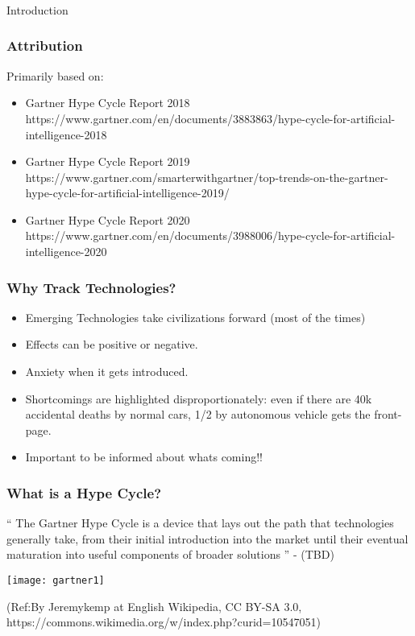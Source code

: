 \begin{frame}[fragile]\frametitle{}
\begin{center}
{\Large Introduction}
\end{center}
\end{frame}

\begin{frame}[fragile]\frametitle{Attribution}

Primarily based on:
\begin{itemize}
\item Gartner Hype Cycle Report 2018 {\tiny https://www.gartner.com/en/documents/3883863/hype-cycle-for-artificial-intelligence-2018}
\item Gartner Hype Cycle Report 2019 {\tiny https://www.gartner.com/smarterwithgartner/top-trends-on-the-gartner-hype-cycle-for-artificial-intelligence-2019/}
\item Gartner Hype Cycle Report 2020 {\tiny https://www.gartner.com/en/documents/3988006/hype-cycle-for-artificial-intelligence-2020}
\end{itemize}
\end{frame}


\begin{frame}[fragile]\frametitle{Why Track Technologies?}

\begin{itemize}
\item Emerging Technologies take civilizations forward (most of the times)
\item Effects can be positive or negative. 
\item Anxiety when it gets introduced.
\item Shortcomings are highlighted disproportionately: even if there are 40k accidental deaths by normal cars, 1/2 by autonomous vehicle gets the front-page.
\item Important to be informed about whats coming!!
\end{itemize}
\end{frame}


\begin{frame}[fragile]\frametitle{What is a Hype Cycle?}

`` The Gartner Hype Cycle is a device that lays out the path that technologies generally take, from their initial introduction into the market until their eventual maturation into useful components of broader solutions '' - (TBD)


\begin{center}
\texttt{[image: gartner1]}
\end{center}

{\tiny (Ref:By Jeremykemp at English Wikipedia, CC BY-SA 3.0, https://commons.wikimedia.org/w/index.php?curid=10547051)}

\end{frame}


